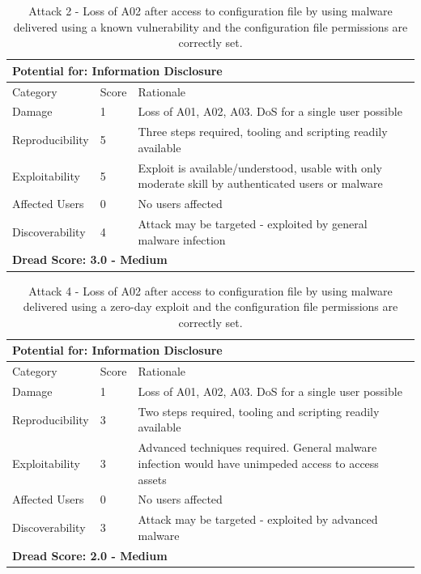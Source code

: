 \documentclass [11pt, proquest] {uwthesis}[2020/02/24]
\begin{document}
\begin{table}[H]
\begin{tabular}{|m{3cm}|m{1cm}|p{27em} |}
\multicolumn{3}{l}{Potential for: Information Disclosure}  \\
\hline
Category & Score & Rationale \\
\hline
Damage          & 1     & Loss of A01, A02, A03. DoS for a single user possible \\
\hline
Reproducibility & 5     & Three steps required, tooling and scripting readily available  \\
\hline
Exploitability & 5      & Exploit is available/understood, usable with only moderate skill by authenticated users or malware \\
\hline
Affected Users  & 0     &  No users affected  \\
\hline
Discoverability & 4     & Attack may be targeted - exploited by general malware infection \\
\hline
\multicolumn{3}{l}{\textbf{Dread Score: 3.0 - Medium}} 
\end{tabular}
\caption{Attack 2 - Loss of A02 after access to configuration file by using malware delivered using a known vulnerability and the configuration file permissions are correctly set.}
\label{hsm:attack2}
\end{table}

\begin{table}[H]
\begin{tabular}{|m{3cm}|m{1cm}|p{27em} |}
\multicolumn{3}{l}{Potential for: Information Disclosure}  \\
\hline
Category & Score & Rationale \\
\hline
Damage          & 1     & Loss of A01, A02, A03. DoS for a single user possible  \\
\hline
Reproducibility & 3     & Two steps required, tooling and scripting readily available  \\
\hline
Exploitability & 3      & Advanced techniques required. General malware infection would have unimpeded access to access assets  \\
\hline
Affected Users  & 0     &  No users affected   \\
\hline
Discoverability & 3     & Attack may be targeted - exploited by advanced malware \\
\hline
\multicolumn{3}{l}{\textbf{Dread Score: 2.0 - Medium}} 
\end{tabular}

\caption{Attack 4 - Loss of A02 after access to configuration file by using malware delivered using a zero-day exploit and the configuration file permissions are correctly set.}
\label{hsm:attack4}
\end{table}
\end{document}
